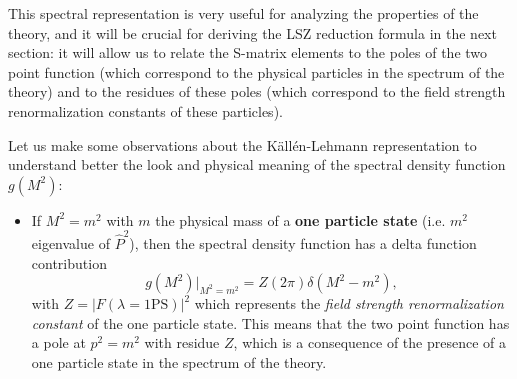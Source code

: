 This spectral representation is very useful for analyzing the properties of the theory, and it will be crucial for deriving the LSZ reduction formula in the next section: it will allow us to relate the S-matrix elements to the poles of the two point function (which correspond to the physical particles in the spectrum of the theory) and to the residues of these poles (which correspond to the field strength renormalization constants of these particles).

Let us make some observations about the Källén-Lehmann representation to understand better the look and physical meaning of the spectral density function \(g(M^2)\):
\begin{itemize}
    \item If \(M^2 = m^2\) with \(m\) the physical mass of a \textbf{one particle state} (i.e. \(m^2\) eigenvalue of \(\hat{P}^2\)), then the spectral density function has a delta function contribution
          \[
              g(M^2) \Big|_{M^2=m^2} = Z (2\pi) \delta(M^2 - m^2),
          \]
          with \(Z = \vert F(\lambda = \text{1PS}) \vert^2 \) which represents the \textit{field strength renormalization constant} of the one particle state. This means that the two point function has a pole at \(p^2 = m^2\) with residue \(Z\), which is a consequence of the presence of a one particle state in the spectrum of the theory.


\end{itemize}
